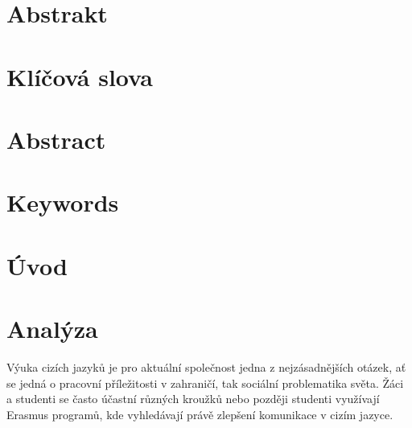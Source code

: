 \documentclass[a4paper,11pt,titlepage,fleqn]{article}
\begin{document}



\setcounter{page}{3}

\newpage
\thispagestyle{plain}
\section*{Abstrakt}

\section*{Klíčová slova}

\thispagestyle{empty}
\newpage

\section*{Abstract}

\section*{Keywords}

\thispagestyle{empty}

\newpage
\thispagestyle{empty}
\setcounter{tocdepth}{2}
\tableofcontents


\newpage
\thispagestyle{empty}
\listoffigures
\listoftables
\renewcommand{\lstlistingname}{Ukázka kódu}
\renewcommand{\lstlistlistingname}{Seznam ukázek zdrojových kódů}
\lstlistoflistings

\newpage
\thispagestyle{empty}
\printglossary[title=Seznam zkratek]
\cleardoublepage

\section{Úvod}


\newpage
\section{Analýza}
    Výuka cizích jazyků je pro aktuální společnost jedna z nejzásadnějších otázek, ať se jedná o pracovní příležitosti v zahraničí, tak sociální problematika světa. Žáci a studenti se často účastní různých kroužků nebo později studenti využívají Erasmus programů, kde vyhledávají právě zlepšení komunikace v cizím jazyce. 
\end{document}
